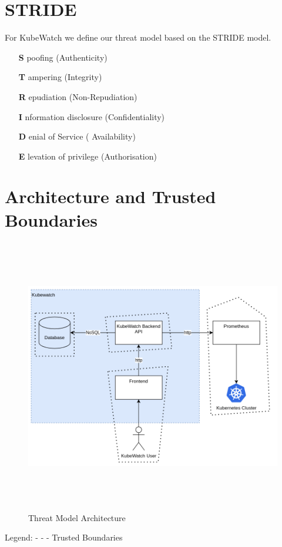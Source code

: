 \section{STRIDE}

For KubeWatch we define our threat model based on the STRIDE model.
\begin{itemize}
    \item [{\bfseries S}]poofing (Authenticity)
    \item [{\bfseries T}]ampering (Integrity)
    \item [{\bfseries R}]epudiation (Non-Repudiation)
    \item [{\bfseries I}]nformation disclosure (Confidentiality)
    \item [{\bfseries D}]enial of Service ( Availability)
    \item [{\bfseries E}]levation of privilege (Authorisation)
\end{itemize}


\section{Architecture and Trusted Boundaries}

\begin{figure}[h]
    \centering
    \caption{\label{fig:threat-model-architecture}Threat Model Architecture}
    \includegraphics[height=12cm]{resources/architecture_threat_model.png}
\end{figure}
Legend: \newline
- - - Trusted Boundaries


